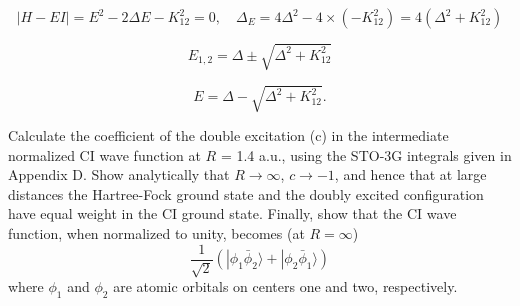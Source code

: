 \documentclass[a4paper]{book}
\begin{document}
	\begin{solution}
	
	\[
		| H - EI | = E^2 - 2 \Delta E -K^2_{12} = 0 , \quad \Delta_E = 4 \Delta^2 - 4 \times ( -K^2_{12} ) = 4( \Delta^2 + K^2_{12} )
	\]	
	
	\[
		E_{1,2} = \Delta \pm \sqrt{ \Delta^2 + K^2_{12} }
	\]	
	
	\begin{equation}
		E = \Delta - \sqrt{ \Delta^2 + K^2_{12} }.
	\end{equation}
	
	\end{solution}
	
	\begin{exercise}
	Calculate the coefficient of the double excitation (c) in the intermediate normalized CI wave function at $R$ = 1.4 a.u., using the STO-3G integrals given in Appendix D. Show analytically that $R \rightarrow \infty$, $c \rightarrow -1$, and hence that at large distances the Hartree-Fock ground state and the doubly excited configuration have equal weight in the CI ground state. Finally, show that the CI wave function, when normalized to unity, becomes (at $R=\infty$)
	\[
		\frac{1}{\sqrt{2}} \left( | \phi_1 \bar{\phi}_2 \rangle + | \phi_2 \bar{\phi}_1 \rangle \right)
	\]
	where $\phi_1$ and $\phi_2$ are atomic orbitals on centers one and two, respectively.
	\end{exercise}
	
\end{document}
